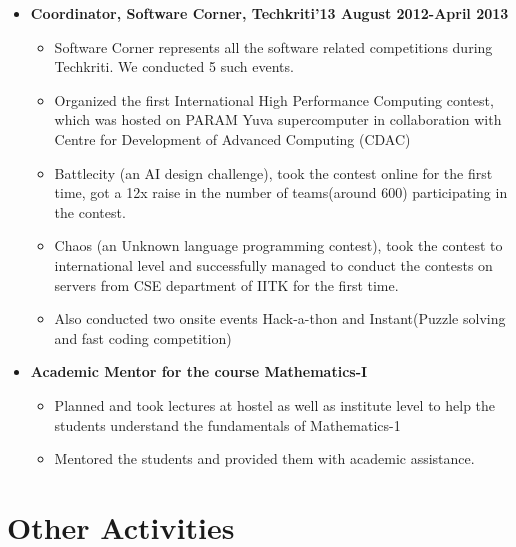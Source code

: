 \documentclass[margin,line]{resume}
\begin{document}
\begin{resume}
\begin{itemize}
    \item  \textbf{\textsf Coordinator, Software Corner, Techkriti'13 August 2012-April 2013}
      \begin{itemize}
      \item Software Corner represents all the software related competitions during Techkriti. We conducted 5 such events.
      \item Organized the first International High Performance Computing contest, which was hosted on PARAM Yuva supercomputer in collaboration with Centre for Development of Advanced Computing (CDAC)
      \item  Battlecity (an AI design challenge), took the contest online for the first time, got a 12x raise in the number of teams(around 600) participating in the contest. 
      \item Chaos (an Unknown language programming contest), took the contest to international level and successfully managed to conduct the contests on servers from CSE department of IITK for the first time.
      \item Also conducted two onsite events Hack-a-thon and Instant(Puzzle solving and fast coding competition)
      \end{itemize}

    \item \textbf{\textsf Academic Mentor for the course Mathematics-I}
      \begin{itemize}
      \item Planned and took lectures at hostel as well as institute level to help the students understand the fundamentals of Mathematics-1
      \item Mentored the students and provided them with academic assistance.
      \end{itemize}
      

    \end{itemize}

    \section{\mysidestyle Other Activities} 
  
    \begin{itemize}


\end{itemize}
\end{resume}
\end{document}
